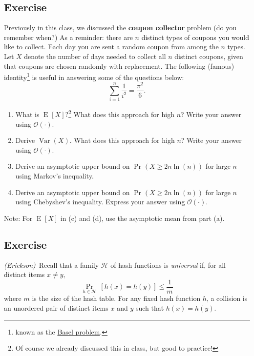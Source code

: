 \documentclass[14pt]{extreport}
\newcounter{counter}
\newcommand{\Exercise}{Exercise \stepcounter{counter}\thecounter}
\newcommand{\Var}[1]{\operatorname{Var}\left(#1\right)}
\newcommand{\E}[2][]{\operatorname{E}_{#1}\left[#2\right]}
\DeclareMathOperator*{\oldPr}{Pr}
\renewcommand{\Pr}[2][]{\operatorname{Pr}_{#1}\left(#2\right)}
\begin{document}
\subsection*{\Exercise}
    Previously in this class, we discussed the \textbf{coupon collector} problem (do you remember when?) As a reminder: there are \( n \) distinct types of coupons you would like to collect. Each day you are sent a random coupon from among the \( n \) types. Let \( X \) denote the number of days needed to collect all \( n \) distinct coupons, given that coupons are chosen randomly with replacement. The following (famous) identity\footnote{known as the \href{https://en.wikipedia.org/wiki/Basel_problem}{Basel problem}.} is useful in answering some of the questions below:
    \[ \sum_{i=1}^{n} \frac{1}{i^2} = \frac{\pi^2}{6}. \]
    \begin{enumerate}
        \item What is \( \E{X}? \)\footnote{Of course we already discussed this in class, but good to practice!} What does this approach for high \( n \)? Write your answer using \( \mathcal{O}(\cdot) \).
        \item Derive \( \Var{X} \). What does this approach for high \( n \)? Write your answer using \( \mathcal{O}(\cdot) \).
        \item Derive an asymptotic upper bound on \( \Pr{X \geq 2n \ln(n)} \) for large \( n \) using Markov’s inequality.
        \item Derive an asymptotic upper bound on \( \Pr{X \geq 2n \ln(n)} \) for large \( n \) using Chebyshev’s inequality. Express your answer using \( \mathcal{O}(\cdot) \).
    \end{enumerate}
    Note: For \( \E{X} \) in (c) and (d), use the asymptotic mean from part (a).

\subsection*{\Exercise}
    \textit{(Erickson)}\ Recall that a family \(\mathcal{H}\) of hash functions is \textit{universal} if, for all distinct items \( x \neq y \), $$ \oldPr_{h\in\mathcal{H}}\ [h(x)=h(y)] \leq \frac{1}{m}$$ where \( m \) is the size of the hash table. For any fixed hash function \( h \), a collision is an unordered pair of distinct items \( x \) and \( y \) such that \( h(x)=h(y) \).
\end{document}
